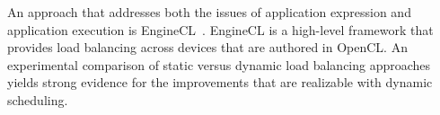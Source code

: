 An approach that addresses both the issues of application expression
and application execution is EngineCL~\cite{dng+19}.  EngineCL is a
high-level framework that provides load balancing across devices that
are authored in OpenCL.  An experimental comparison of static versus
dynamic load balancing approaches yields strong evidence for the
improvements that are realizable with dynamic scheduling.


